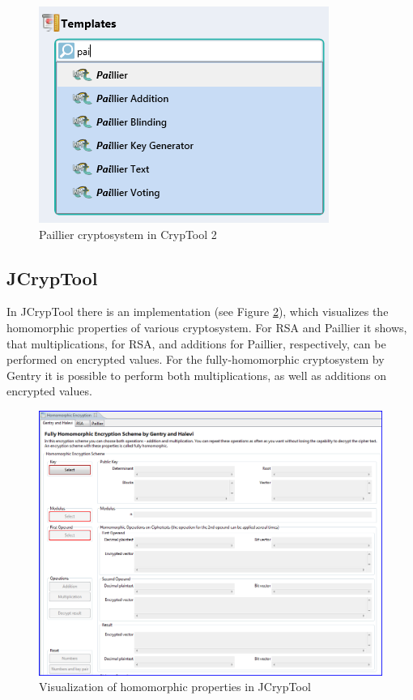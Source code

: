 \begin{figure}[ht]
\begin{center}
\includegraphics[scale=0.8]{figures/CT2-Paillier.png}
\caption{Paillier cryptosystem in CrypTool 2} 
\label{CT2-Paillier}
\end{center}
\end{figure}

\newpage
\subsection{JCrypTool}

In JCrypTool there is an implementation (see Figure \ref{JCT-HomEnc}), which visualizes the homomorphic properties of various cryptosystem. For RSA and Paillier it shows, that multiplications, for RSA, and additions for Paillier, respectively, can be performed on encrypted values. For the fully-homomorphic cryptosystem by Gentry it is possible to perform both multiplications, as well as additions on encrypted values.

\begin{figure}[ht]
\begin{center}
\includegraphics[scale=0.4]{figures/JCT-HomEnc.PNG}
\caption{Visualization of homomorphic properties in JCrypTool} 
\label{JCT-HomEnc}
\end{center}
\end{figure}


